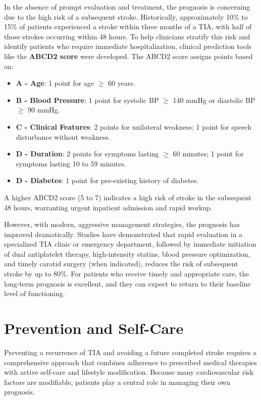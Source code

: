 In the absence of prompt evaluation and treatment, the prognosis is concerning due to the high risk of a subsequent stroke. Historically, approximately 10\% to 15\% of patients experienced a stroke within three months of a TIA, with half of those strokes occurring within 48 hours. To help clinicians stratify this risk and identify patients who require immediate hospitalization, clinical prediction tools like the \textbf{ABCD2 score} were developed. The ABCD2 score assigns points based on:
\begin{itemize}
    \item \textbf{A - Age}: 1 point for age $\ge$ 60 years.
    \item \textbf{B - Blood Pressure}: 1 point for systolic BP $\ge$ 140 mmHg or diastolic BP $\ge$ 90 mmHg.
    \item \textbf{C - Clinical Features}: 2 points for unilateral weakness; 1 point for speech disturbance without weakness.
    \item \textbf{D - Duration}: 2 points for symptoms lasting $\ge$ 60 minutes; 1 point for symptoms lasting 10 to 59 minutes.
    \item \textbf{D - Diabetes}: 1 point for pre-existing history of diabetes.
\end{itemize}
A higher ABCD2 score (5 to 7) indicates a high risk of stroke in the subsequent 48 hours, warranting urgent inpatient admission and rapid workup.

However, with modern, aggressive management strategies, the prognosis has improved dramatically. Studies have demonstrated that rapid evaluation in a specialized TIA clinic or emergency department, followed by immediate initiation of dual antiplatelet therapy, high-intensity statins, blood pressure optimization, and timely carotid surgery (when indicated), reduces the risk of subsequent stroke by up to 80\%. For patients who receive timely and appropriate care, the long-term prognosis is excellent, and they can expect to return to their baseline level of functioning.

\section*{Prevention and Self-Care}
Preventing a recurrence of TIA and avoiding a future completed stroke requires a comprehensive approach that combines adherence to prescribed medical therapies with active self-care and lifestyle modification. Because many cardiovascular risk factors are modifiable, patients play a central role in managing their own prognosis.

